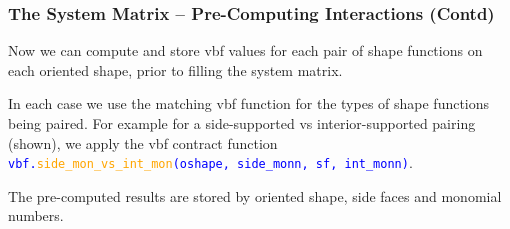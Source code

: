 \documentclass[compress]{beamer}
\begin{document}
\begin{frame}
  \frametitle{The System Matrix -- Pre-Computing Interactions (Contd)}
  Now we can compute and store vbf values for each pair of shape functions on each oriented shape, prior to filling the system matrix.
  
  \pause

  \pause
  \vspace{0.15cm}
  In each case we use the matching vbf function for the types of shape functions being paired.  For example for
  a side-supported vs interior-supported pairing (shown), we apply the vbf contract function\\
  \texttt{\small \textcolor{blue}{vbf.\textcolor{orange}{side\_mon\_vs\_int\_mon}(oshape, side\_monn, sf, int\_monn)}}.

  The pre-computed results are stored by oriented shape, side faces and monomial numbers.
\end{frame}
\end{document}
